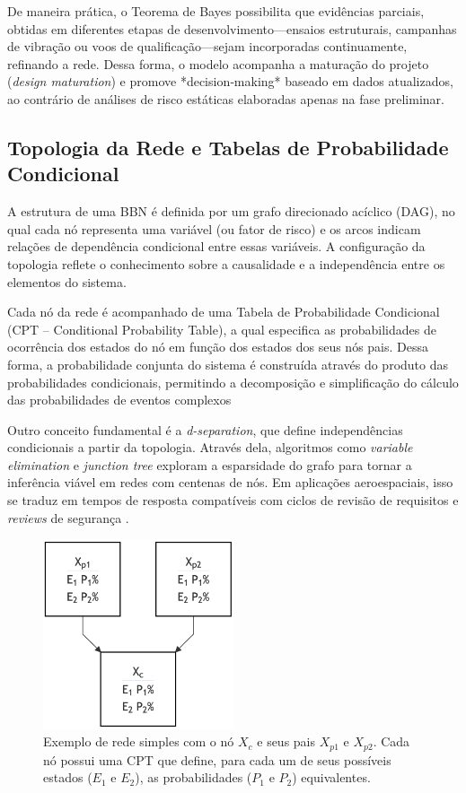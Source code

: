 De maneira prática, o Teorema de Bayes possibilita que evidências parciais, obtidas em diferentes etapas de desenvolvimento—ensaios estruturais, campanhas de vibração ou voos de qualificação—sejam incorporadas continuamente, refinando a rede. Dessa forma, o modelo acompanha a maturação do projeto (\emph{design maturation}) e promove *decision‑making* baseado em dados atualizados, ao contrário de análises de risco estáticas elaboradas apenas na fase preliminar.




\subsection{Topologia da Rede e Tabelas de Probabilidade Condicional}
\label{subsec:estrutura}
A estrutura de uma BBN é definida por um grafo direcionado acíclico (DAG), no qual cada nó representa uma variável (ou fator de risco) e os arcos indicam relações de dependência condicional entre essas variáveis. A configuração da topologia reflete o conhecimento sobre a causalidade e a independência entre os elementos do sistema.


Cada nó da rede é acompanhado de uma Tabela de Probabilidade Condicional (CPT – Conditional Probability Table), a qual especifica as probabilidades de ocorrência dos estados do nó em função dos estados dos seus nós pais. Dessa forma, a probabilidade conjunta do sistema é construída através do produto das probabilidades condicionais, permitindo a decomposição e simplificação do cálculo das probabilidades de eventos complexos


Outro conceito fundamental é a \emph{d-separation}, que define independências condicionais a partir da topologia. Através dela, algoritmos como \emph{variable elimination} e \emph{junction tree} exploram a esparsidade do grafo para tornar a inferência viável em redes com centenas de nós. Em aplicações aeroespaciais, isso se traduz em tempos de resposta compatíveis com ciclos de revisão de requisitos e \emph{reviews} de segurança \cite{korb2010bayesian}.

\begin{figure}[H]
  \centering
  \includegraphics[width=0.5\textwidth]{Cap2/bbn_networks.png}
  \caption{Exemplo de rede simples com o nó $X_c$ e seus pais $X_{p1}$ e $X_{p2}$. Cada nó possui uma CPT que define, para cada um de seus possíveis estados ($E_1$ e $E_2$), as probabilidades ($P_1$ e $P_2$) equivalentes.}
  \label{fig:exemplo_bbn}
\end{figure}

